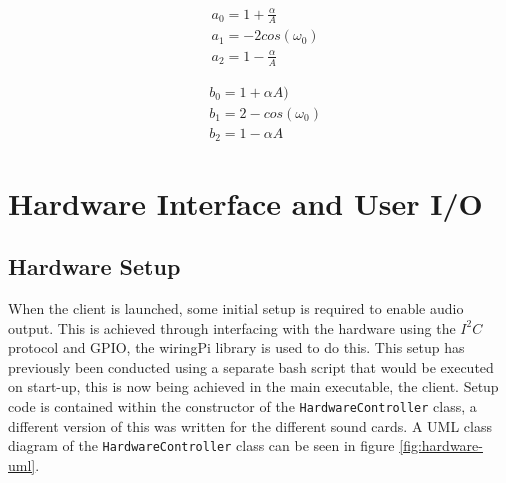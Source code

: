 \documentclass[main.tex]{subfiles}
\begin{document}
\begin{center}
    \begin{minipage}{.5\linewidth}
        \begin{equation*}
            \begin{aligned} 
                &a_0 = 1 + \frac{\alpha}{A} \\
                &a_1 = -2cos(\omega_ 0) \\
                &a_2 = 1 - \frac{\alpha}{A}
            \end{aligned}
        \end{equation*}
        \end{minipage}%
        \begin{minipage}{.5\linewidth}
        \begin{equation}
            \begin{aligned}
                &b_0 = 1 + \alpha A) \\
                &b_1 = 2 - cos(\omega _0) \\
                &b_2 =1 - \alpha A
            \end{aligned}
        \end{equation}
    \end{minipage}
\end{center}


\section{Hardware Interface and User I/O}
\subsection{Hardware Setup}
When the client is launched, some initial setup is required to enable audio output.
This is achieved through interfacing with the hardware using the $I^2C$ protocol and GPIO, the wiringPi library is used to do this.
This setup has previously been conducted using a separate bash script that would be executed on start-up, this is now being achieved in the main executable, the client.
Setup code is contained within the constructor of the \lstinline{HardwareController} class, a different version of this was written for the different sound cards.
A UML class diagram of the \lstinline{HardwareController} class can be seen in figure \ref{fig:hardware-uml}.
\end{document}
